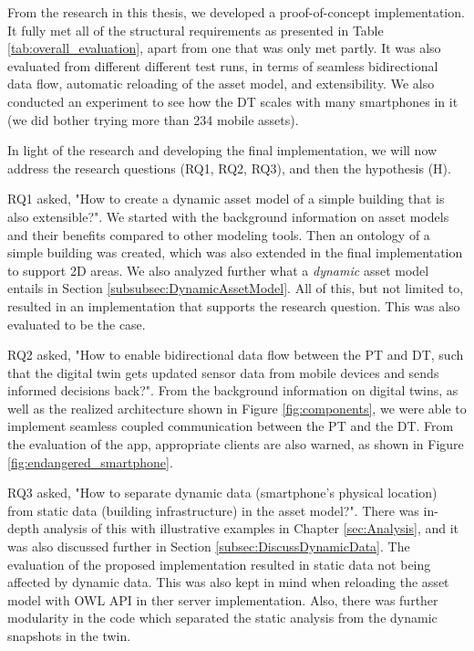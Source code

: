 \documentclass{article}
\begin{document}
From the research in this thesis, we developed a proof-of-concept implementation. It fully met all of the structural requirements as presented in Table \ref{tab:overall_evaluation}, apart from one that was only met partly. It was also evaluated from different different test runs, in terms of seamless bidirectional data flow, automatic reloading of the asset model, and extensibility. We also conducted an experiment to see how the DT scales with many smartphones in it (we did bother trying more than 234 mobile assets).

In light of the research and developing the final implementation, we will now address the research questions (RQ1, RQ2, RQ3), and then the hypothesis (H).

RQ1 asked, "How to create a dynamic asset model of a simple building that is also
extensible?". 
We started with the background information on asset models and their benefits compared to other modeling tools. Then an ontology of a simple building was created, which was also extended in the final implementation to support 2D areas. We also analyzed further what a \emph{dynamic} asset model entails in Section \ref{subsubsec:DynamicAssetModel}. All of this, but not limited to, resulted in an implementation that supports the research question. This was also evaluated to be the case.

RQ2 asked, "How to enable bidirectional data flow between the PT and DT, such that
the digital twin gets updated sensor data from mobile devices and sends
informed decisions back?".
From the background information on digital twins, as well as the realized architecture shown in Figure \ref{fig:components}, we were able to implement seamless coupled communication between the PT and the DT. From the evaluation of the app, appropriate clients are also warned, as shown in Figure \ref{fig:endangered_smartphone}.

RQ3 asked, "How to separate dynamic data (smartphone’s physical location) from
static data (building infrastructure) in the asset model?". There was in-depth analysis of this with illustrative examples in Chapter \ref{sec:Analysis}, and it was also discussed further in Section \ref{subsec:DiscussDynamicData}. The evaluation of the proposed implementation resulted in static data not being affected by dynamic data. This was also kept in mind when reloading the asset model with OWL API in ther server implementation. Also, there was further modularity in the code which separated the static analysis from the dynamic snapshots in the twin. 
\end{document}
